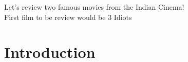 \documentclass{article}
\begin{document}
Let's review two famous movies from the Indian Cinema!\\
First film to be  review would be 3 Idiots


\section{Introduction}
\end{document}

